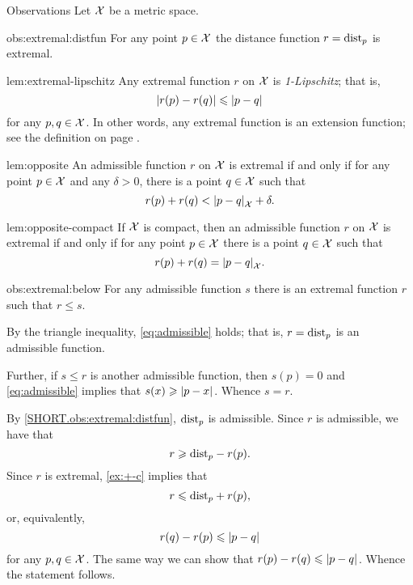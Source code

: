 \begin{thm}{Observations}\label{obs:extremal}
Let $\mathcal{X}$ be a metric space.

\begin{subthm}{obs:extremal:distfun}
For any point $p\in\mathcal{X}$
the distance function $r\z=\distfun_p$ is extremal.
\end{subthm}

\begin{subthm}{lem:extremal-lipschitz}
Any extremal function $r$ on $\mathcal{X}$ is \emph{1-Lipschitz};
that is,
\[|r(p)-r(q)|\le \dist{p}{q}{}\]
for any $p,q\in\mathcal{X}$.
In other words, any extremal function is an extension function; see the definition on page \pageref{page:extension function}.
\end{subthm}

\begin{subthm}{lem:opposite}
An admissible function $r$ on $\mathcal{X}$ is extremal if and only if
for any point $p\in\mathcal{X}$ and any $\delta>0$, there is a point $q\in \mathcal{X}$
such that 
\[r(p)+r(q)<\dist{p}{q}{\spc{X}}+\delta.\]
\end{subthm}

\begin{subthm}{lem:opposite-compact}
If $\mathcal{X}$ is compact, then an admissible function $r$ on $\mathcal{X}$ is extremal if and only if
for any point $p\in\mathcal{X}$ there is a point $q\in \mathcal{X}$
such that 
\[r(p)+r(q)=\dist{p}{q}{\spc{X}}.\]
\end{subthm}



\begin{subthm}{obs:extremal:below}
For any admissible function $s$ there is an extremal function $r$ such that $r\le s$.
\end{subthm}

\end{thm}

By the triangle inequality, \ref{eq:admissible} holds;
that is, $r=\mathrm{dist}_p$ is an admissible function.

Further, if $s\le r$ is another admissible function, then $s(p)=0$ and \ref{eq:admissible} implies that $s(x)\z\ge\dist{p}{x}{}$.
Whence $s=r$.

By \ref{SHORT.obs:extremal:distfun}, $\mathrm{dist}_p$ is admissible.
Since $r$ is admissible, we have that
\[r\geqslant \mathrm{dist}_p-r(p).\]
Since $r$ is extremal, \ref{ex:+-c} implies that
\[r\leqslant \mathrm{dist}_p+r(p),\]
or, equivalently,
\[r(q)-r(p)\le \dist{p}{q}{}\]
for any $p,q\in\mathcal{X}$.
The same way we can show that
$r(p)-r(q)\le \dist{p}{q}{}$.
Whence the statement follows.

